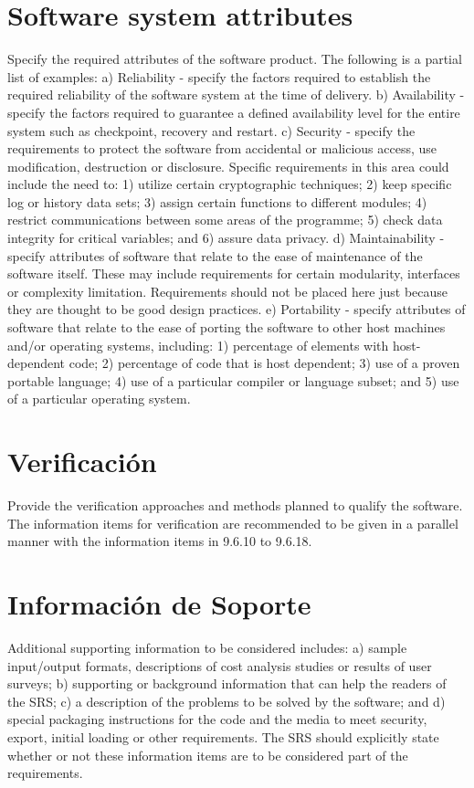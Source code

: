 \documentclass[12pt, a4paper, twoside]{article}
\begin{document}
 \section{Software system attributes}
 Specify the required attributes of the software product. The following is a partial list of examples:
 a) Reliability - specify the factors required to establish the required reliability of the software system
 at the time of delivery.
 b) Availability - specify the factors required to guarantee a defined availability level for the entire
 system such as checkpoint, recovery and restart.
 c) Security - specify the requirements to protect the software from accidental or malicious access,
 use modification, destruction or disclosure. Specific requirements in this area could include the
 need to:
 1) utilize certain cryptographic techniques;
 2) keep specific log or history data sets;
 3) assign certain functions to different modules;
 4) restrict communications between some areas of the programme;
 5) check data integrity for critical variables; and
 6) assure data privacy.
 d) Maintainability - specify attributes of software that relate to the ease of maintenance of the
 software itself. These may include requirements for certain modularity, interfaces or complexity
 limitation. Requirements should not be placed here just because they are thought to be good design
 practices.
 e) Portability - specify attributes of software that relate to the ease of porting the software to other
 host machines and/or operating systems, including:
 1) percentage of elements with host-dependent code;
 2) percentage of code that is host dependent;
 3) use of a proven portable language;
 4) use of a particular compiler or language subset; and
 5) use of a particular operating system.

 \section{Verificación}
 Provide the verification approaches and methods planned to qualify the software. The information
 items for verification are recommended to be given in a parallel manner with the information items in
 9.6.10 to 9.6.18.
 
 \section{Información de Soporte}
 Additional supporting information to be considered includes:
 a) sample input/output formats, descriptions of cost analysis studies or results of user surveys;
 b) supporting or background information that can help the readers of the SRS;
 c) a description of the problems to be solved by the software; and
 d) special packaging instructions for the code and the media to meet security, export, initial loading
 or other requirements.
 The SRS should explicitly state whether or not these information items are to be considered part of the
 requirements.
\end{document}
